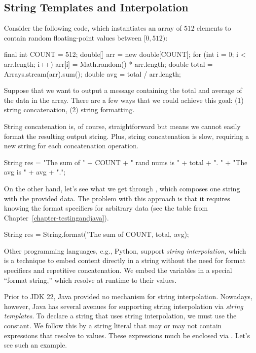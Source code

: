 \subsection{String Templates and Interpolation}

Consider the following code, which instantiates an array of $512$ elements to contain random floating-point values between $[0, 512)$:

\begin{verbnobox}[\small]
final int COUNT = 512;
double[] arr = new double[COUNT];
for (int i = 0; i < arr.length; i++) {
  arr[i] = Math.random() * arr.length;
}
double total = Arrays.stream(arr).sum();
double avg = total / arr.length;
\end{verbnobox}

Suppose that we want to output a message containing the total and average of the data in the  array. There are a few ways that we could achieve this goal: (1) string concatenation, (2) string formatting.

String concatenation is, of course, straightforward but means we cannot easily format the resulting output string. Plus, string concatenation is slow, requiring a new string for each concatenation operation.

\begin{verbnobox}[\small]
String res = "The sum of " + COUNT + " rand nums is " + total + ". "
             + "The avg is " + avg + ".";
\end{verbnobox}

On the other hand, let's see what we get through , which composes one string with the provided data. The problem with this approach is that it requires knowing the format specifiers for arbitrary data (see the table from Chapter~\ref{chapter-testingandjava}).

\begin{verbnobox}[\small]
String res = String.format("The sum of %
                           COUNT, total, avg);
\end{verbnobox}

Other programming languages, e.g., Python, support \emph{string interpolation}, which is a technique to embed content directly in a string without the need for format specifiers and repetitive concatenation. We embed the variables in a special ``format string,'' which resolve at runtime to their values.

Prior to JDK 22, Java provided no mechanism for string interpolation. Nowadays, however, Java has several avenues for supporting string interpolation via \emph{string templates}. To declare a string that uses string interpolation, we must use the  constant. We follow this by a string literal that may or may not contain expressions that resolve to values. These expressions much be enclosed via \ttt{\textbackslash$\{\}$}. Let's see such an example.

